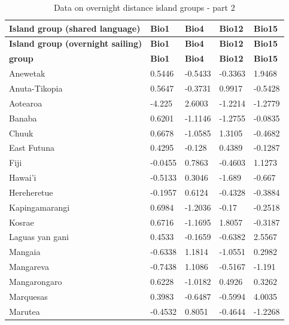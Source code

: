 \documentclass[draft,10pt]{article} %
\begin{document}
\begin{landscape}
\begin{longtable}{| p{2.6cm} |  p{2cm} | p{2cm}  | p{2cm}  | p{2cm}|}

\caption{{Data on overnight distance island groups - part 2}} 
\label{overnight_groups_table_2} \\
\hline
\textbf{Island group (shared language)} & \textbf{Bio1} & \textbf{Bio4} & \textbf{Bio12} & \textbf{Bio15} \\ \hline

\endfirsthead

\hline
\textbf{Island group (overnight sailing)} & \textbf{Bio1} & \textbf{Bio4} & \textbf{Bio12} & \textbf{Bio15} \\ \hline
\endhead

\textbf{ group } & \textbf{ Bio1 } & \textbf{ Bio4 } & \textbf{ Bio12 } & \textbf{ Bio15 } \\ \hline
 Anewetak & 0.5446 & -0.5433 & -0.3363 & 1.9468 \\ \hline
 Anuta-Tikopia & 0.5647 & -0.3731 & 0.9917 & -0.5428 \\ \hline
 Aotearoa & -4.225 & 2.6003 & -1.2214 & -1.2779 \\ \hline
 Banaba & 0.6201 & -1.1146 & -1.2755 & -0.0835 \\ \hline
 Chuuk & 0.6678 & -1.0585 & 1.3105 & -0.4682 \\ \hline
 East Futuna & 0.4295 & -0.128 & 0.4389 & -0.1287 \\ \hline
 Fiji & -0.0455 & 0.7863 & -0.4603 & 1.1273 \\ \hline
 Hawai'i & -0.5133 & 0.3046 & -1.689 & -0.667 \\ \hline
 Hereheretue & -0.1957 & 0.6124 & -0.4328 & -0.3884 \\ \hline
 Kapingamarangi & 0.6984 & -1.2036 & -0.17 & -0.2518 \\ \hline
 Kosrae & 0.6716 & -1.1695 & 1.8057 & -0.3187 \\ \hline
 Laguas yan gani & 0.4533 & -0.1659 & -0.6382 & 2.5567 \\ \hline
 Mangaia & -0.6338 & 1.1814 & -1.0551 & 0.2982 \\ \hline
 Mangareva & -0.7438 & 1.1086 & -0.5167 & -1.191 \\ \hline
 Mangarongaro & 0.6228 & -1.0182 & 0.4926 & 0.3262 \\ \hline
 Marquesas & 0.3983 & -0.6487 & -0.5994 & 4.0035 \\ \hline
 Marutea & -0.4532 & 0.8051 & -0.4644 & -1.2268 \\ \hline

\end{longtable}
\end{landscape}
\end{document}
